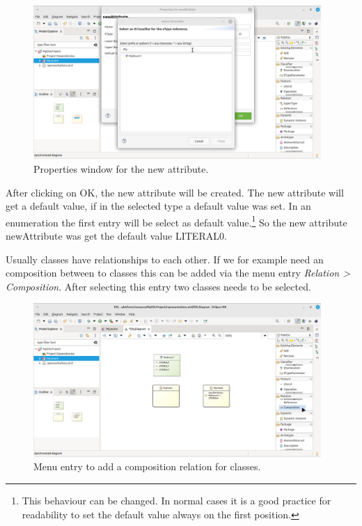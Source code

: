 \documentclass[a4paper,10pt]{article}
\newcommand{\gerquot}[1]{\glqq#1\grqq}
\newcommand{\ScreenshotWidth}{0.975}
\begin{document}
\begin{figure}[H]
\centering
\includegraphics[width=\ScreenshotWidth\textwidth]{./Screenshots/SS_16.png}
\caption{Properties window for the new attribute.}
\label{fig:SSSelectionWindowOfAnAttributesType}
\end{figure}

After clicking on \gerquot{OK}, the new attribute will be created. The new attribute will get a default value, if in the selected type a default value was set. In an enumeration the first entry will be select as default value.\footnote{This behaviour can be changed. In normal cases it is a good practice for readability to set the default value always on the first position.} So the new attribute \gerquot{newAttribute} was get the default value \gerquot{LITERAL0}.

\noindent Usually classes have relationships to each other. If we for example need an composition between to classes this can be added via the menu entry \emph{Relation > Composition}. After selecting this entry two classes needs to be selected.

\begin{figure}[H]
\centering
\includegraphics[width=\ScreenshotWidth\textwidth]{./Screenshots/SS_17.png}
\caption{Menu entry to add a composition relation for classes.}
\label{fig:SSMenuForSelectionOfAComposition}
\end{figure}
\end{document}
